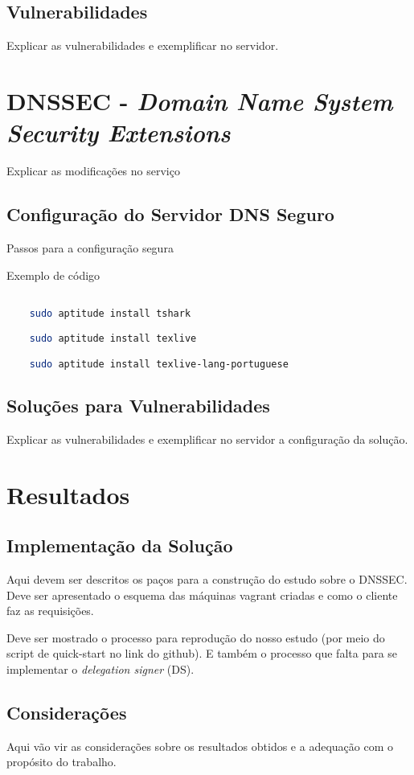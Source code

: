 \documentclass[a4paper]{report} %
\begin{document}
\section{Vulnerabilidades}
\label{sec_vulnerabilidades}

Explicar as vulnerabilidades e exemplificar no servidor.

\chapter{ DNSSEC  - \textit{Domain Name System Security Extensions}}
\label{chap_dnssec}

Explicar as modificações no serviço

\section{Configuração do Servidor DNS Seguro}
\label{sec_config_segura}

Passos para a configuração segura

Exemplo de código
\begin{lstlisting}[language=bash]

	sudo aptitude install tshark

	sudo aptitude install texlive

	sudo aptitude install texlive-lang-portuguese

\end{lstlisting}

\section{Soluções para Vulnerabilidades }
\label{sec_solucoes}

Explicar as vulnerabilidades e exemplificar no servidor a configuração da solução.

\chapter{Resultados}

\section{Implementação da Solução}

Aqui devem ser descritos os paços para a construção do estudo sobre o DNSSEC. Deve ser apresentado o esquema das máquinas vagrant criadas e como o cliente faz as requisições.

Deve ser mostrado o processo para reprodução do nosso estudo (por meio do script de quick-start no link do github). E também o processo que falta para se implementar o \textit{delegation signer} (DS). 

\section{Considerações}

Aqui vão vir as considerações sobre os resultados obtidos e a adequação com o propósito do trabalho.

\begin{thebibliography}{99}
\end{thebibliography}

\end{document}
